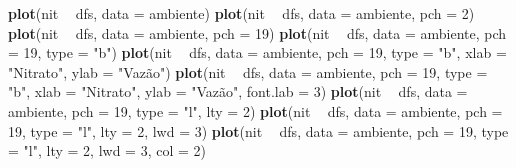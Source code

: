 \documentclass[
]{book}
\newenvironment{Shaded}{\begin{snugshade}}{\end{snugshade}}
\newcommand{\DataTypeTok}[1]{\textcolor[rgb]{0.13,0.29,0.53}{#1}}
\newcommand{\DecValTok}[1]{\textcolor[rgb]{0.00,0.00,0.81}{#1}}
\newcommand{\KeywordTok}[1]{\textcolor[rgb]{0.13,0.29,0.53}{\textbf{#1}}}
\newcommand{\NormalTok}[1]{#1}
\newcommand{\OperatorTok}[1]{\textcolor[rgb]{0.81,0.36,0.00}{\textbf{#1}}}
\newcommand{\StringTok}[1]{\textcolor[rgb]{0.31,0.60,0.02}{#1}}
\begin{document}
\begin{Shaded}
\begin{Highlighting}[]
\KeywordTok{plot}\NormalTok{(nit }\OperatorTok{~}\StringTok{ }\NormalTok{dfs, }\DataTypeTok{data =}\NormalTok{ ambiente)}
\KeywordTok{plot}\NormalTok{(nit }\OperatorTok{~}\StringTok{ }\NormalTok{dfs, }\DataTypeTok{data =}\NormalTok{ ambiente, }\DataTypeTok{pch =} \DecValTok{2}\NormalTok{)}
\KeywordTok{plot}\NormalTok{(nit }\OperatorTok{~}\StringTok{ }\NormalTok{dfs, }\DataTypeTok{data =}\NormalTok{ ambiente, }\DataTypeTok{pch =} \DecValTok{19}\NormalTok{)}
\KeywordTok{plot}\NormalTok{(nit }\OperatorTok{~}\StringTok{ }\NormalTok{dfs, }\DataTypeTok{data =}\NormalTok{ ambiente, }\DataTypeTok{pch =} \DecValTok{19}\NormalTok{, }\DataTypeTok{type =} \StringTok{"b"}\NormalTok{)}
\KeywordTok{plot}\NormalTok{(nit }\OperatorTok{~}\StringTok{ }\NormalTok{dfs, }\DataTypeTok{data =}\NormalTok{ ambiente, }\DataTypeTok{pch =} \DecValTok{19}\NormalTok{, }\DataTypeTok{type =} \StringTok{"b"}\NormalTok{,}
     \DataTypeTok{xlab =} \StringTok{"Nitrato"}\NormalTok{, }\DataTypeTok{ylab =} \StringTok{"Vazão"}\NormalTok{)}
\KeywordTok{plot}\NormalTok{(nit }\OperatorTok{~}\StringTok{ }\NormalTok{dfs, }\DataTypeTok{data =}\NormalTok{ ambiente, }\DataTypeTok{pch =} \DecValTok{19}\NormalTok{, }\DataTypeTok{type =} \StringTok{"b"}\NormalTok{, }
     \DataTypeTok{xlab =} \StringTok{"Nitrato"}\NormalTok{, }\DataTypeTok{ylab =} \StringTok{"Vazão"}\NormalTok{, }\DataTypeTok{font.lab =} \DecValTok{3}\NormalTok{)}
\KeywordTok{plot}\NormalTok{(nit }\OperatorTok{~}\StringTok{ }\NormalTok{dfs, }\DataTypeTok{data =}\NormalTok{ ambiente, }\DataTypeTok{pch =} \DecValTok{19}\NormalTok{, }\DataTypeTok{type =} \StringTok{"l"}\NormalTok{, }
     \DataTypeTok{lty =} \DecValTok{2}\NormalTok{)}
\KeywordTok{plot}\NormalTok{(nit }\OperatorTok{~}\StringTok{ }\NormalTok{dfs, }\DataTypeTok{data =}\NormalTok{ ambiente, }\DataTypeTok{pch =} \DecValTok{19}\NormalTok{, }\DataTypeTok{type =} \StringTok{"l"}\NormalTok{, }
     \DataTypeTok{lty =} \DecValTok{2}\NormalTok{, }\DataTypeTok{lwd =} \DecValTok{3}\NormalTok{)}
\KeywordTok{plot}\NormalTok{(nit }\OperatorTok{~}\StringTok{ }\NormalTok{dfs, }\DataTypeTok{data =}\NormalTok{ ambiente, }\DataTypeTok{pch =} \DecValTok{19}\NormalTok{, }\DataTypeTok{type =} \StringTok{"l"}\NormalTok{, }
     \DataTypeTok{lty =} \DecValTok{2}\NormalTok{, }\DataTypeTok{lwd =} \DecValTok{3}\NormalTok{, }\DataTypeTok{col =} \DecValTok{2}\NormalTok{)}
\end{Highlighting}
\end{Shaded}
\end{document}
